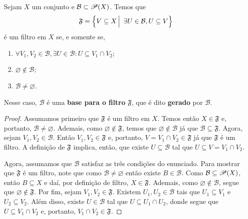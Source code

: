  \begin{theorem}
 
 
 Sejam
 $X$
 um conjunto e
 $\mathcal{B} \subset {\mathscr{P}({X})}$.
 Temos que
 \begin{equation*}
     \mathfrak{F}
     =
     \setsuchthat{V \subseteq X}{\exists U \in \mathcal{B}, U \subseteq V}
 \end{equation*}
 é um filtro em 
 $X$
 se, e somente se,
 \begin{enumerate}
     \item $\forall V_1, V_2 \in \mathcal{B}, \exists U \in \mathcal{B} : U \subseteq V_1 \cap V_2$;
     \item $\varnothing \notin \mathcal{B}$;
     \item $\mathcal{B} \neq \varnothing$.
 \end{enumerate}
 Nesse caso, 
 $\mathcal{B}$
 é uma \textbf{base para o filtro}
 $\mathfrak{F}$,
 que é dito \textbf{gerado} por
 $\mathcal{B}$.
 \end{theorem}
 
 \begin{proof}
 Assumamos primeiro que
 $\mathfrak{F}$
 é um filtro em
 $X$.
 Temos então
 $X \in \mathfrak{F}$
 e, portanto,
 $\mathcal{B} \neq \varnothing$.
 Ademais, como
 $\varnothing \notin \mathfrak{F}$,
 temos que
 $\varnothing \notin \mathcal{B}$
 já que
 $\mathcal{B} \subseteq \mathfrak{F}$.
 Agora, sejam
 $V_1, V_2 \in \mathcal{B}$.
 Então 
 $V_1, V_2 \in \mathfrak{F}$
 e, portanto,
 $V = V_1 \cap V_2 \in \mathfrak{F}$
 já que 
 $\mathfrak{F}$
 é um filtro.
 A definição de
 $\mathfrak{F}$
 implica, então, que existe
 $U \subseteq \mathcal{B}$
 tal que 
 $U \subseteq V = V_1 \cap V_2$.
 
 Agora, assumamos que 
 $\mathcal{B}$
 satisfaz as três condições do enunciado.
 Para mostrar que 
 $\mathfrak{F}$
 é um filtro, note que como
 $\mathcal{B} \neq \varnothing$
 então existe 
 $B \in \mathcal{B}$.
 Como 
 $\mathcal{B} \subseteq {\mathscr{P}({X})}$,
 então
 $B \subseteq X$
 e daí, por definição de filtro,
 $X \in \mathfrak{F}$.
 Ademais, como
 $\varnothing \notin \mathcal{B}$,
 segue que
 $\varnothing \notin \mathfrak{F}$.
 Por fim, sejam
 $V_1, V_2 \in \mathfrak{F}$.
 Existem 
 $U_1, U_2 \in \mathcal{B}$
 tais que
 $U_1 \subseteq V_1$
 e
 $U_2 \subseteq V_2$.
 Além disso, existe
 $U \in \mathcal{B}$
 tal que
 $U \subseteq U_1 \cap U_2$,
 donde segue que
 $U \subseteq V_1 \cap V_2$
 e, portanto,
 $V_1 \cap V_2 \in \mathfrak{F}$.
 \end{proof}